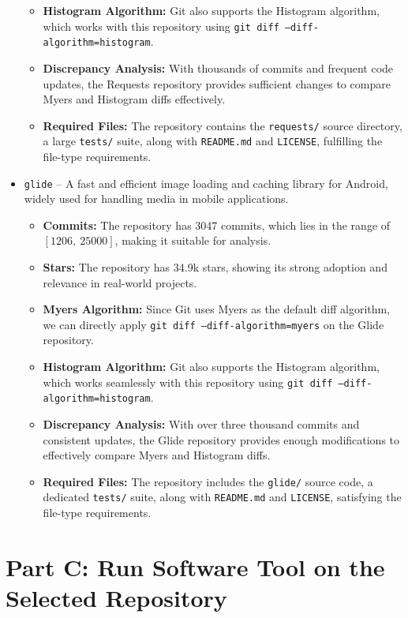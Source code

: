 \documentclass[12pt, a4paper]{report}
\begin{document}
\begin{itemize}
\begin{itemize}
            \item \textbf{Histogram Algorithm:} Git also supports the Histogram algorithm, which works with this repository using \texttt{git diff --diff-algorithm=histogram}.
            \item \textbf{Discrepancy Analysis:} With thousands of commits and frequent code updates, the Requests repository provides sufficient changes to compare Myers and Histogram diffs effectively.
            \item \textbf{Required Files:} The repository contains the \texttt{requests/} source directory, a large \texttt{tests/} suite, along with \texttt{README.md} and \texttt{LICENSE}, fulfilling the file-type requirements.
        \end{itemize}
    \item \texttt{glide} -- A fast and efficient image loading and caching library for Android, widely used for handling media in mobile applications.  
        \begin{itemize}
            \item \textbf{Commits:} The repository has 3047 commits, which lies in the range of $[1206,\ 25000]$, making it suitable for analysis.  
            \item \textbf{Stars:} The repository has 34.9k stars, showing its strong adoption and relevance in real-world projects.  
            \item \textbf{Myers Algorithm:} Since Git uses Myers as the default diff algorithm, we can directly apply \texttt{git diff --diff-algorithm=myers} on the Glide repository.  
            \item \textbf{Histogram Algorithm:} Git also supports the Histogram algorithm, which works seamlessly with this repository using \texttt{git diff --diff-algorithm=histogram}.  
            \item \textbf{Discrepancy Analysis:} With over three thousand commits and consistent updates, the Glide repository provides enough modifications to effectively compare Myers and Histogram diffs.  
            \item \textbf{Required Files:} The repository includes the \texttt{glide/} source code, a dedicated \texttt{tests/} suite, along with \texttt{README.md} and \texttt{LICENSE}, satisfying the file-type requirements.  
        \end{itemize}
\end{itemize}

\section{Part C: Run Software Tool on the Selected Repository}
\end{document}
